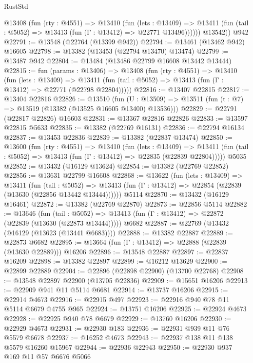 \begin{lexlean}{RustStd}
\begin{coremodule}
          @13408
            (fun (rty : @4551) =>
            @13410
              (fun (lets : @13409) =>
              @13411 (fun (tail : @5052) => @13413 (fun (Γ : @13412) => @22771 @13496))))))
        @13542))
    @942
@22791 := @13548 (@22764 (@13399 @942))
@22794 := @13461 (@13462 @942) @16605
@22798 := @13382 (@13453 (@22794 @13470) @13474)
@22799 := @13487 @942
@22804 := @13484 (@13486 @22799 @16608 @13442 @13444)
@22815 := fun (params : @13406) =>
  @13408
    (fun (rty : @4551) =>
    @13410
      (fun (lets : @13409) =>
      @13411 (fun (tail : @5052) => @13413 (fun (Γ : @13412) => @22771 (@22798 @22804)))))
@22816 := @13407 @22815
@22817 := @13404 @22816
@22826 := @13510
    (fun (U : @13509) => @13511 (fun (t : @7) => @13519 (@13382 (@13525 @16605 @13400) @13536)))
@22829 := @22791 (@22817 @22826) @16603
@22831 := @13367 @22816 @22826
@22833 := @13597 @22815 @5633
@22835 := @13382 (@22769 @16131)
@22836 := @22794 @16134
@22837 := @13453 @22836
@22839 := @13382 (@22837 @13474)
@22850 := @13600
    (fun (rty : @4551) =>
    @13410
      (fun (lets : @13409) =>
      @13411 (fun (tail : @5052) => @13413 (fun (Γ : @13412) => @22835 (@22839 @22804)))))
    @5035
@22852 := @13432 (@16129 @13624)
@22854 := @13382 (@22769 @22852)
@22856 := @13631 @22799 @16608
@22868 := @13622
    (fun (lets : @13409) =>
    @13411
      (fun (tail : @5052) =>
      @13413 (fun (Γ : @13412) => @22854 (@22839 (@13630 (@22856 @13442 @13444))))))
    @5114
@22870 := @13432 (@16129 @16461)
@22872 := @13382 (@22769 @22870)
@22873 := @22856 @5114
@22882 := @13646
    (fun (tail : @5052) => @13413 (fun (Γ : @13412) => @22872 (@22839 (@13630 (@22873 @13444)))))
    @6682
@22887 := @22769 (@13432 (@16129 (@13623 (@13441 @6683))))
@22888 := @13382 @22887
@22889 := @22873 @6682
@22895 := @13664 (fun (Γ : @13412) => @22888 (@22839 (@13630 @22889))) @16206
@22896 := @13548 @22887
@22897 := @22837 @16209
@22898 := @13382 @22897
@22899 := @16212 @13629
@22900 := @22899 @22889
@22904 := @22896 (@22898 @22900) (@13700 @22768)
@22908 := @13548 @22897 @22900 (@13705 @22836)
@22909 := @15651 @16206
@22913 := @22909 @941 @11 @5114 @6681
@22914 := @13737 @16206
@22915 := @22914 @4673
@22916 := @22915 @497
@22923 := @22916 @940 @78 @11 @5114 @6679 @4755 @965
@22924 := @13751 @16206
@22925 := @22924 @4673
@22928 := @22925 @940 @78 @6679
@22929 := @13760 @16206
@22930 := @22929 @4673
@22931 := @22930 @183
@22936 := @22931 @939 @11 @76 @5579 @6678
@22937 := @16252 @4673
@22943 := @22937 @138 @11 @138 @5579 @16260 @15967
@22944 := @22936 @22943
@22950 := @22930 @937 @169 @11 @57 @6676 @5066

\end{coremodule}
\end{lexlean}
